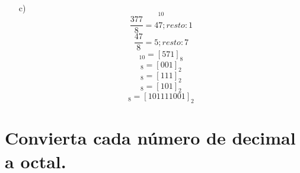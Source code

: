 \documentclass{article}
\begin{document}
\begin{enumerate}
\item[c)] \begin{equation*}[377]_{10}\end{equation*}\begin{equation*} \frac{377}{8} =  47;  resto: 1\end{equation*}\begin{equation*} \frac{47}{8} =  5;  resto: 7\end{equation*}\begin{equation*}[377]_{10} = [571]_{8}\end{equation*}\begin{equation*} [1]_8 = [001]_2\end{equation*}\begin{equation*} [7]_8 = [111]_2\end{equation*}\begin{equation*} [5]_8 = [101]_2\end{equation*}\begin{equation*} [571]_8 = [101111001]_2\end{equation*}
\end{enumerate}

\section{Convierta cada número de decimal a octal.}
\end{document}
